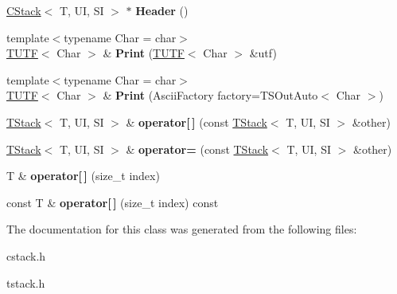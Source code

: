 \begin{DoxyCompactItemize}
\mbox{\hyperlink{struct___1_1_c_stack}{C\+Stack}}$<$ T, UI, SI $>$ $\ast$ {\bfseries Header} ()
\item 
\mbox{\label{class___1_1_t_stack_aa807083c97cac6838547d05e9f0756b3}} 
{\footnotesize template$<$typename Char  = char$>$ }\\\mbox{\hyperlink{struct___1_1_t_u_t_f}{T\+U\+TF}}$<$ Char $>$ \& {\bfseries Print} (\mbox{\hyperlink{struct___1_1_t_u_t_f}{T\+U\+TF}}$<$ Char $>$ \&utf)
\item 
\mbox{\label{class___1_1_t_stack_a9b9b59e44a14114df9f20d6f409369bf}} 
{\footnotesize template$<$typename Char  = char$>$ }\\\mbox{\hyperlink{struct___1_1_t_u_t_f}{T\+U\+TF}}$<$ Char $>$ \& {\bfseries Print} (Ascii\+Factory factory=T\+S\+Out\+Auto$<$ Char $>$)
\item 
\mbox{\label{class___1_1_t_stack_ab8307681fe06e2546ab911054f4075f9}} 
\mbox{\hyperlink{class___1_1_t_stack}{T\+Stack}}$<$ T, UI, SI $>$ \& {\bfseries operator\mbox{[}$\,$\mbox{]}} (const \mbox{\hyperlink{class___1_1_t_stack}{T\+Stack}}$<$ T, UI, SI $>$ \&other)
\item 
\mbox{\label{class___1_1_t_stack_a7c6ff938767943189ae9a45dba64005f}} 
\mbox{\hyperlink{class___1_1_t_stack}{T\+Stack}}$<$ T, UI, SI $>$ \& {\bfseries operator=} (const \mbox{\hyperlink{class___1_1_t_stack}{T\+Stack}}$<$ T, UI, SI $>$ \&other)
\item 
\mbox{\label{class___1_1_t_stack_a9f00b02772398e109740586536f2c5e5}} 
T \& {\bfseries operator\mbox{[}$\,$\mbox{]}} (size\+\_\+t index)
\item 
\mbox{\label{class___1_1_t_stack_ac296fc97f8b012627c04d9662534de40}} 
const T \& {\bfseries operator\mbox{[}$\,$\mbox{]}} (size\+\_\+t index) const
\end{DoxyCompactItemize}


The documentation for this class was generated from the following files\+:\begin{DoxyCompactItemize}
\item 
cstack.\+h\item 
tstack.\+h\end{DoxyCompactItemize}
